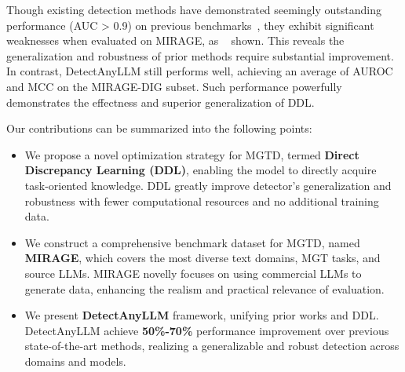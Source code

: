 Though existing detection methods have demonstrated seemingly outstanding performance (AUC > 0.9) on previous benchmarks~\cite{imbd, detectrl}, they exhibit significant weaknesses when evaluated on MIRAGE, as ~ shown.
%
This reveals the generalization and robustness of prior methods require substantial improvement. 
%
In contrast, DetectAnyLLM still performs well, achieving an average of  AUROC and  MCC on the MIRAGE-DIG subset.
%
Such performance powerfully demonstrates the effectness and superior generalization of DDL.


Our contributions can be summarized into the following points:


\begin{itemize}[leftmargin=*]
    \item We propose a novel optimization strategy for MGTD, termed \textbf{Direct Discrepancy Learning (DDL)}, enabling the model to
    directly acquire task-oriented knowledge. DDL greatly improve detector's generalization and robustness with fewer computational resources and no additional training data.
    \item We construct a comprehensive benchmark dataset for MGTD, named \textbf{MIRAGE}, which covers the most diverse text domains, MGT tasks, and source LLMs. MIRAGE novelly focuses on using commercial LLMs to generate data, enhancing the realism and practical relevance of evaluation.
    \item We present \textbf{DetectAnyLLM} framework, unifying prior works and DDL. DetectAnyLLM achieve \textbf{50\%-70\%} performance improvement over previous state-of-the-art methods, realizing a generalizable and robust detection across domains and models.
\end{itemize}

